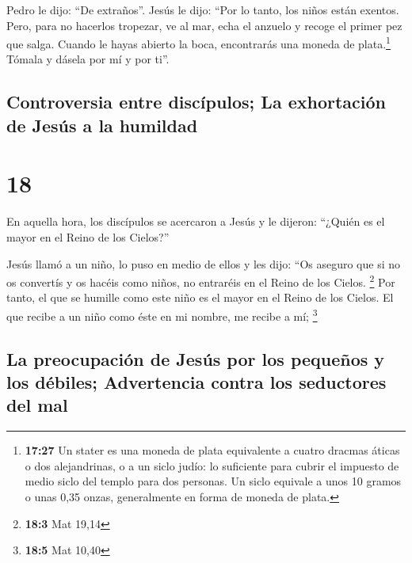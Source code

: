  Pedro le dijo: ``De extraños''. Jesús le dijo: ``Por lo
tanto, los niños están exentos.  Pero, para no hacerlos
tropezar, ve al mar, echa el anzuelo y recoge el primer pez que salga.
Cuando le hayas abierto la boca, encontrarás una moneda de
plata.\footnote{\textbf{17:27} Un stater es una moneda de plata
  equivalente a cuatro dracmas áticas o dos alejandrinas, o a un siclo
  judío: lo suficiente para cubrir el impuesto de medio siclo del templo
  para dos personas. Un siclo equivale a unos 10 gramos o unas 0,35
  onzas, generalmente en forma de moneda de plata.} Tómala y dásela por
mí y por ti''.

\hypertarget{controversia-entre-discuxedpulos-la-exhortaciuxf3n-de-jesuxfas-a-la-humildad}{%
\subsection{Controversia entre discípulos; La exhortación de Jesús a la
humildad}\label{controversia-entre-discuxedpulos-la-exhortaciuxf3n-de-jesuxfas-a-la-humildad}}

\hypertarget{section-17}{%
\section{18}\label{section-17}}

 En aquella hora, los discípulos se acercaron a Jesús y le
dijeron: ``¿Quién es el mayor en el Reino de los Cielos?''

 Jesús llamó a un niño, lo puso en medio de ellos
 y les dijo: ``Os aseguro que si no os convertís y os
hacéis como niños, no entraréis en el Reino de los Cielos. \footnote{\textbf{18:3}
  Mat 19,14}  Por tanto, el que se humille como este niño
es el mayor en el Reino de los Cielos.  El que recibe a un
niño como éste en mi nombre, me recibe a mí; \footnote{\textbf{18:5} Mat
  10,40}

\hypertarget{la-preocupaciuxf3n-de-jesuxfas-por-los-pequeuxf1os-y-los-duxe9biles-advertencia-contra-los-seductores-del-mal}{%
\subsection{La preocupación de Jesús por los pequeños y los débiles;
Advertencia contra los seductores del
mal}\label{la-preocupaciuxf3n-de-jesuxfas-por-los-pequeuxf1os-y-los-duxe9biles-advertencia-contra-los-seductores-del-mal}}

